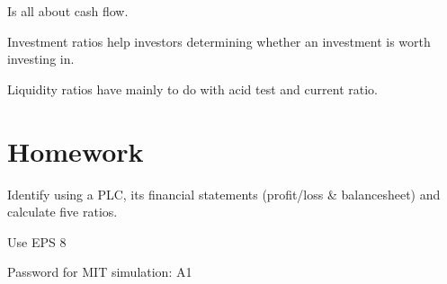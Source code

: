 \documentclass{article}
\begin{document}
Is all about cash flow.

Investment ratios help investors determining whether an investment is worth investing in.

Liquidity ratios have mainly to do with acid test and current ratio.

\section{Homework}
Identify using a PLC, its financial statements (profit/loss & balancesheet) and calculate five ratios.

Use EPS 8

Password for MIT simulation: A1 
\end{document}
